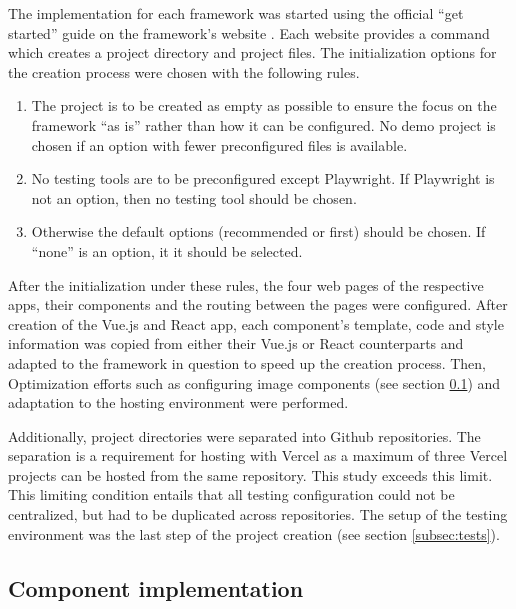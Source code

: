 \documentclass[a4paper, 12pt]{article}
\begin{document}
The implementation for each framework was started using the official \enquote{get started} guide on the framework's website \citep{AngularGetStarted,AstroGetStarted,NextGetStarted,NuxtGetStarted,ReactGetStarted,SvelteGetStarted,VueGetStarted}.
Each website provides a command which creates a project directory and project files.
The initialization options for the creation process were chosen with the following rules.

\begin{enumerate}
  \item The project is to be created as empty as possible to ensure the focus on the framework \enquote{as is} rather than how it can be configured.
  No demo project is chosen if an option with fewer preconfigured files is available.
  \item No testing tools are to be preconfigured except Playwright.
  If Playwright is not an option, then no testing tool should be chosen.
  \item Otherwise the default options (recommended or first) should be chosen.
  If \enquote{none} is an option, it it should be selected.
\end{enumerate}

After the initialization under these rules, the four web pages of the respective apps, their components and the routing between the pages were configured.
After creation of the Vue.js and React app, each component's template, code and style information was copied from either their Vue.js or React counterparts and adapted to the framework in question to speed up the creation process.
Then, Optimization efforts such as configuring image components (see section \ref{subsec:components}) and adaptation to the hosting environment were performed.

Additionally, project directories were separated into Github repositories.
The separation is a requirement for hosting with Vercel as a maximum of three Vercel projects can be hosted from the same repository.
This study exceeds this limit.
This limiting condition entails that all testing configuration could not be centralized, but had to be duplicated across repositories.
The setup of the testing environment was the last step of the project creation (see section \ref{subsec:tests}).

\subsection{Component implementation}\label{subsec:components}
% 
\end{document}
